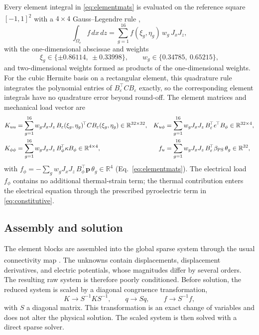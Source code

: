\documentclass[a4paper, 11pt, twoside]{article}
\newcommand{\supercite}[1]{\!\!\textsuperscript{\cite{#1}}}
\begin{document}
Every element integral in \eqref{eq:elementmats} is evaluated on the reference square
$[-1,1]^2$ with a $4\times4$ Gauss--Legendre rule
\supercite{AbramowitzStegun1965,Gautschi2004},
\begin{equation}
\int_{\Omega_e}f\,dx\,dz
=\sum_{g=1}^{16}f(\xi_g,\eta_g)\,w_g\,J_xJ_z,
\label{eq:quad}
\end{equation}
with the one-dimensional abscissae and weights
\begin{equation}
\xi_g\in\{\pm0.86114,\ \pm0.33998\},\qquad
w_g\in\{0.34785,\ 0.65215\},
\label{eq:gaussweights}
\end{equation}
and two-dimensional weights formed as products of the one-dimensional weights.
For the cubic Hermite basis on a rectangular element, this quadrature rule integrates
the polynomial entries of $B_\varepsilon^{\!\top}CB_\varepsilon$ exactly, so the
corresponding element integrals have no quadrature error beyond round-off. The
element matrices and mechanical load vector are
\begin{align}
K_{uu}
&=\sum_{g=1}^{16}w_gJ_xJ_z\,
B_\varepsilon(\xi_g,\eta_g)^{\!\top}C
B_\varepsilon(\xi_g,\eta_g)
\in\mathbb{R}^{32\times32}, &
K_{u\phi}
&=\sum_{g=1}^{16}w_gJ_xJ_z\,
B_\varepsilon^{\!\top}e^{\!\top}B_\phi
\in\mathbb{R}^{32\times4},
\notag\\
K_{\phi\phi}
&=\sum_{g=1}^{16}w_gJ_xJ_z\,
B_\phi^{\!\top}\kappa B_\phi
\in\mathbb{R}^{4\times4}, &
f_u
&=\sum_{g=1}^{16}w_gJ_xJ_z\,
B_\varepsilon^{\!\top}\beta_{\mathrm{PS}}\,\theta_g
\in\mathbb{R}^{32},
\label{eq:elemsums}
\end{align}
with
$f_\phi=-\sum_g w_gJ_xJ_z\,B_\phi^{\!\top}\bm p\,\theta_g\in\mathbb{R}^4$
(Eq.~\eqref{eq:elementmats}). The electrical load $f_\phi$ contains no additional
thermal-strain term; the thermal contribution enters the electrical equation through
the prescribed pyroelectric term in \eqref{eq:constitutive}.

\subsection{Assembly and solution}
\label{sec:assembly}

The element blocks are assembled into the global sparse system through the usual
connectivity map \supercite{Bathe1996}. The unknowns contain displacements, displacement
derivatives, and electric potentials, whose magnitudes differ by several orders.
The resulting raw system is therefore poorly conditioned. Before solution, the
reduced system is scaled by a diagonal congruence transformation,
\[
K\to S^{-1}KS^{-1},\qquad
q\to Sq,\qquad
f\to S^{-1}f,
\]
with $S$ a diagonal matrix. This transformation is an exact change of variables and
does not alter the physical solution. The scaled system is then solved with a direct
sparse solver.
\end{document}
